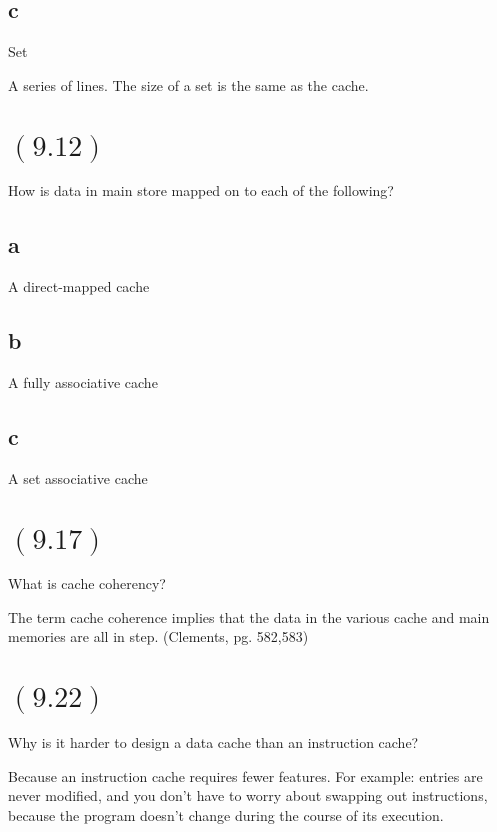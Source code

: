 \documentclass[letterpaper,12pt,titlepage]{article}
\begin{document}
\subsection*{c} Set
\begin{mdframed}[style=MyFrame]
A series of lines. The size of a set is the same as the cache.
\end{mdframed}

\section*{$(9.12)$} How is data in main store mapped on to each of the following?

\subsection*{a} A direct-mapped cache
\begin{mdframed}[style=MyFrame]
\end{mdframed}
\subsection*{b} A fully associative cache
\begin{mdframed}[style=MyFrame]
\end{mdframed}
\subsection*{c} A set associative cache
\begin{mdframed}[style=MyFrame]
\end{mdframed}

\section*{$(9.17)$} What is cache coherency?

\begin{mdframed}[style=MyFrame]
The term cache coherence implies that the data in the various cache and main memories are all in step. (Clements, pg. 582,583)
\end{mdframed}

\section*{$(9.22)$} Why is it harder to design a data cache than an instruction cache?

\begin{mdframed}[style=MyFrame]
Because an instruction cache requires fewer features. For example: entries are never modified, and you don't have to worry about swapping out instructions, because the program doesn't change during the course of its execution.
\end{mdframed}
\end{document}
